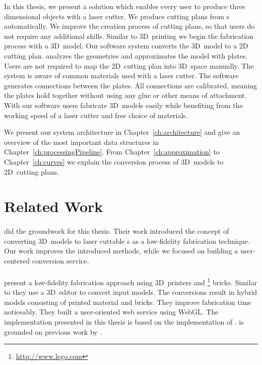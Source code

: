 \documentclass[../ClassicThesis.tex]{subfiles}
\begin{document}
In this thesis, we present a solution which enables every
user to produce three dimensional objects with a laser
cutter. We produce cutting plans from {\threedmodel}s
automatically. We improve the creation process of cutting
plans, so that users do not require any additional skills.
Similar to 3D~printing we begin the fabrication process with
a 3D~model.
Our software system {\platener} converts the 3D~model to a
2D cutting plan. {\platener} analyzes the geometries and
approximates the model with plates. Users are not required
to map the 2D~cutting plan into 3D~space manually. The
system is aware of common materials used with a laser
cutter. The software generates connections between the
plates. All connections are calibrated, meaning the plates
hold together without using any glue or other means of
attachment. With our software users fabricate 3D~models
easily while benefiting from the working speed of a laser
cutter and free choice of materials.



We present our system architecture in
Chapter~\ref{ch:architecture} and give an overview of the
most important data structures in
Chapter~\ref{ch:processingPipeline}. From
Chapter~\ref{ch:approximation} to Chapter~\ref{ch:curves} we
explain the conversion process of 3D~models to 2D~cutting
plans.

\section{Related Work}
\label{sec:related-work}

\paragraph{{\platener}} \citet{master-thesis} did the groundwork
for this thesis. Their work introduced the concept of converting
3D~models to laser cuttable {\svgfile}s as a low-fidelity fabrication
technique. Our work improves the introduced methods, while we focused
on building a user-centered conversion service.

\paragraph{{\brickify}} \citet{bachelor-thesis} present
a low-fidelity fabrication approach using 3D~printers and
{\lego}\footnote{\url{http://www.lego.com}} bricks. Similar to {\platener} they
use a 3D~editor to convert input models. The conversions
result in hybrid models consisting of printed material and
bricks. They improve fabrication time noticeably. They built
a user-oriented web service using WebGL. The implementation
presented in this thesis is based on the implementation of
{\brickify}. {\brickify} is grounded on previous work by
\citet{fabrickation}.
\end{document}
